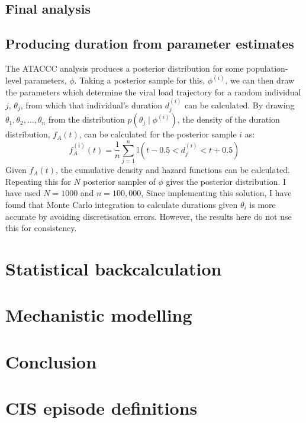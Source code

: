 \documentclass{cam-thesis}
\begin{document}
\section{Final analysis}

\section{Producing duration from parameter estimates}

The ATACCC analysis produces a posterior distribution for some population-level parameters, $\phi$.
Taking a posterior sample for this, $\phi^{(i)}$, we can then draw the parameters which determine the viral
load trajectory for a random individual $j$, $\theta_j$, from which that individual's duration $d_j^{(i)}$ can be calculated.
By drawing $\theta_1, \theta_2, \dots, \theta_n$ from the distribution $p(\theta_j \mid\phi^{(i)})$, the density of the duration distribution, $f_A(t)$, can be
calculated for the posterior sample $i$ as:
$$
f^{(i)}_A(t) = \frac{1}{n}\sum_{j=1}^n \mathbb{I} \left( t-0.5 < d_j^{(i)} < t+0.5 \right)
$$
Given $f_A(t)$, the cumulative density and hazard functions can be calculated.
Repeating this for $N$ posterior samples of $\phi$ gives the posterior distribution.
I have used $N = 1000$ and $n = 100,000$, 
Since implementing this solution, I have found that Monte Carlo integration to calculate durations given $\theta_i$ is more accurate by avoiding discretisation errors.
However, the results here do not use this for consistency.





\chapter{Statistical backcalculation}

\chapter{Mechanistic modelling}

\chapter{Conclusion}

\listoftodos

\printbibliography

\appendix



\chapter{CIS episode definitions} \label{episode-def}

\end{document}
